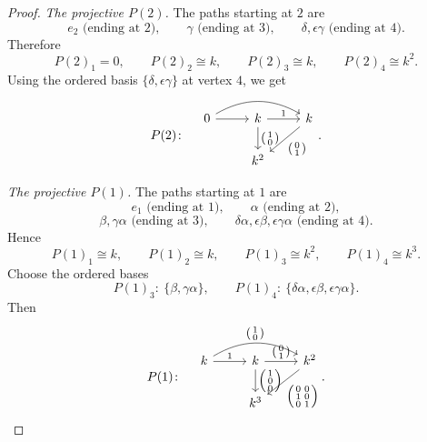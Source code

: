 \documentclass[11pt, a4paper]{article}
\begin{document}
\begin{enumerate}[leftmargin=*, label=\textbf{\arabic*.}]
\begin{proof}
    \smallskip
    \noindent\emph{The projective $P(2)$.}
    The paths starting at $2$ are
    \[
    e_2 \text{ (ending at $2$)},\qquad
    \gamma \text{ (ending at $3$)},\qquad
    \delta,\epsilon\gamma \text{ (ending at $4$)}.
    \]
    Therefore
    \[
    P(2)_1=0,\qquad P(2)_2\cong k,\qquad P(2)_3\cong k,\qquad P(2)_4\cong k^2.
    \]
    Using the ordered basis $\{\delta,\epsilon\gamma\}$ at vertex $4$, we get
    \[
    P(2)\colon\quad
    \begin{tikzcd}
    0 \arrow[r] \arrow[rr, bend left]
    & k \arrow[r, "1"] \arrow[d, "{\begin{psmallmatrix}1\\0\end{psmallmatrix}}"]
    & k \arrow[ld, "{\begin{psmallmatrix}0\\1\end{psmallmatrix}}"] \\
    & k^2 &
    \end{tikzcd}.
    \]
    
    \smallskip
    \noindent\emph{The projective $P(1)$.}
    The paths starting at $1$ are
    \[
    e_1 \text{ (ending at $1$)},\qquad
    \alpha \text{ (ending at $2$)},
    \]
    \[
    \beta,\gamma\alpha \text{ (ending at $3$)},
    \qquad
    \delta\alpha,\epsilon\beta,\epsilon\gamma\alpha \text{ (ending at $4$)}.
    \]
    Hence
    \[
    P(1)_1\cong k,\qquad
    P(1)_2\cong k,\qquad
    P(1)_3\cong k^2,\qquad
    P(1)_4\cong k^3.
    \]
    Choose the ordered bases
    \[
    P(1)_3:\ \{\beta,\gamma\alpha\},
    \qquad
    P(1)_4:\ \{\delta\alpha,\epsilon\beta,\epsilon\gamma\alpha\}.
    \]
    Then
    \[
    P(1)\colon\quad
    \begin{tikzcd}[ampersand replacement=\&]
    k \arrow[r, "1"]
      \arrow[rr, bend left, "{\begin{psmallmatrix}1\\0\end{psmallmatrix}}"]
    \& k \arrow[r, "{\begin{psmallmatrix}0\\1\end{psmallmatrix}}"]
        \arrow[d, "{\begin{psmallmatrix}1\\0\\0\end{psmallmatrix}}"]
    \& k^2 \arrow[ld, "{\begin{psmallmatrix}
    0&0\\
    1&0\\
    0&1
    \end{psmallmatrix}}"] \\
    \& k^3 \&
    \end{tikzcd}.
    \]
    

\end{proof}
\end{enumerate}
\end{document}
